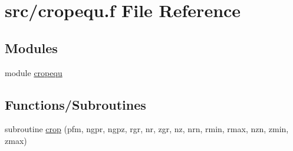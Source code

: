 \hypertarget{cropequ_8f}{
\section{src/cropequ.f File Reference}
\label{cropequ_8f}
}
\subsection*{Modules}
\begin{CompactItemize}
\item 
module \hyperlink{namespacecropequ}{cropequ}
\end{CompactItemize}
\subsection*{Functions/Subroutines}
\begin{CompactItemize}
\item 
subroutine \hyperlink{cropequ_8f_8fbd92e0fb3fd378dbbc241a291b18ec}{crop} (pfm, ngpr, ngpz, rgr, nr, zgr, nz, nrn, rmin, rmax, nzn, zmin, zmax)
\end{CompactItemize}
